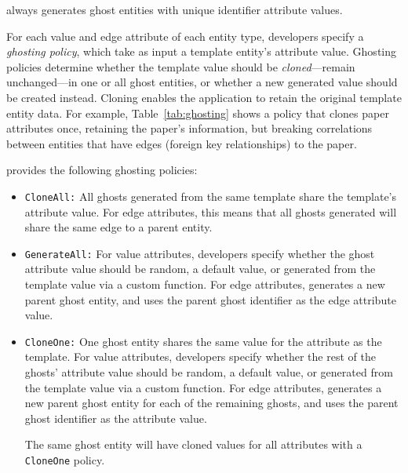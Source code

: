 \sys always generates ghost entities with unique identifier attribute values.

For each value and edge attribute of each entity type, developers specify a \emph{ghosting policy},
which take as input a template entity's attribute value.  Ghosting policies determine whether the
template value should be \emph{cloned}---remain unchanged---in one or all ghost entities, or whether
a new generated value should be created instead. Cloning enables the application to retain
the original template entity data. For example, Table~\ref{tab:ghosting} shows a policy that clones
paper attributes once, retaining the paper's information, but breaking correlations between entities
that have edges (foreign key relationships) to the paper.

\sys provides the following ghosting policies:
\begin{itemize}
    \item \texttt{CloneAll:} All ghosts generated from the same template share the template's 
        attribute value. For edge attributes, this means that all ghosts generated will share the
        same edge to a parent entity.

    \item \texttt{GenerateAll:} 
        For value attributes, developers specify whether the ghost attribute value should be
        random, a default value, or generated from the template value via a custom function.
        For edge attributes, \sys generates a new parent ghost entity, and uses the parent ghost
        identifier as the edge attribute value.

    \item \texttt{CloneOne:} One ghost entity shares the same value for the attribute as the
        template. For value attributes, developers specify whether the rest of the ghosts' attribute
        value should be random, a default value, or generated from the template value via a custom
        function.  For edge attributes, \sys generates a new parent ghost entity for each of the
        remaining ghosts, and uses the parent ghost identifier as the attribute value.

        The same ghost entity will have cloned values for all attributes with a
        \texttt{CloneOne} policy.
\end{itemize}

